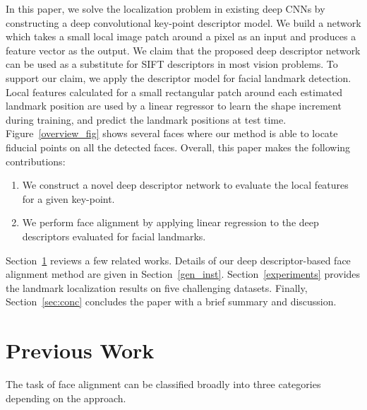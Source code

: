 \documentclass[10pt,twocolumn,letterpaper]{article}
\begin{document}
In this paper, we solve the localization problem in existing deep CNNs by constructing a deep convolutional key-point descriptor model. We build a network which takes a small local image patch around a pixel as an input and produces a feature vector as the output. We claim that the proposed deep descriptor network can be used as a substitute for SIFT \cite{Lowe04distinctiveimage} descriptors in most vision problems. To support our claim, we apply the descriptor model for facial landmark detection. Local features calculated for a small rectangular patch around each estimated landmark position are used by a linear regressor to learn the shape increment during training, and predict the landmark positions at test time. Figure~\ref{overview_fig} shows several faces where our method is able to locate fiducial points on all the detected faces.  Overall, this paper makes the following contributions:
\begin{enumerate}
\item We construct a novel deep descriptor network to evaluate the local features for a given key-point.
\item We perform face alignment by applying linear regression to the deep descriptors evaluated for facial landmarks.
\end{enumerate}




 Section~\ref{prev_work} reviews a few related works.  Details of our deep descriptor-based face alignment method are given in Section~\ref{gen_inst}.  Section~\ref{experiments} provides the landmark localization results on five challenging datasets. Finally, Section~\ref{sec:conc} concludes the paper with a brief summary and discussion.

\section{Previous Work}
\label{prev_work}
The task of face alignment can be classified broadly into three categories depending on the approach.
\end{document}
